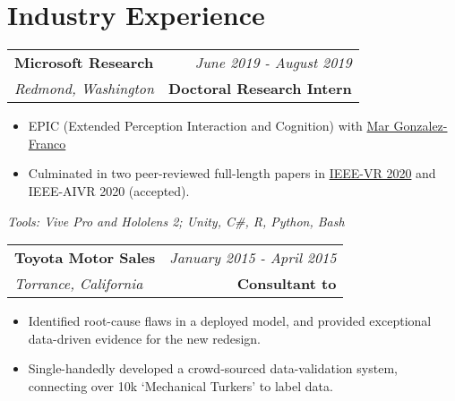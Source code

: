 \documentclass[10pt,a4paper]{article}
\begin{document}
    \vspace*{6mm}\section*{Industry Experience}
  
    \noindent\begin{tabularx}{17cm}{X r}
    \textbf{Microsoft Research} & \textit{June 2019 - August 2019} \\
    \textit{Redmond, Washington} & \textbf{Doctoral Research Intern} \\
  \end{tabularx}

  \vspace*{1mm}\noindent\begin{minipage}{17cm}
    \begin{itemize}[leftmargin=6mm,topsep=0mm,itemsep=-1mm]
      \item EPIC (Extended Perception Interaction and Cognition) with \href{https://www.microsoft.com/en-us/research/people/margon/}{Mar Gonzalez-Franco}
      \item Culminated in two peer-reviewed full-length papers in \href{https://github.com/bc/resume/raw/master/papers/gonzalez-franco_et_al_ieeevr_2020.pdf}{IEEE-VR 2020} and IEEE-AIVR 2020 (accepted).
    \end{itemize}
  \end{minipage}

  \vspace*{2mm}\setlength\parindent{2mm}\begin{minipage}{16.8cm}
    \textit{Tools: Vive Pro and Hololens 2; Unity, C\#, R, Python, Bash}
  \end{minipage}


  \vspace*{3mm}\noindent\begin{tabularx}{17cm}{X r}
    \textbf{Toyota Motor Sales} & \textit{January 2015 - April 2015} \\
    \textit{Torrance, California} & \textbf{Consultant to} \\
  \end{tabularx}

  \vspace*{1mm}\noindent\begin{minipage}{17cm}
    \begin{itemize}[leftmargin=6mm,topsep=0mm,itemsep=-1mm]
      \item Identified root-cause flaws in a deployed model, and provided exceptional data-driven evidence for the new redesign.
      \item Single-handedly developed a crowd-sourced data-validation system, connecting over 10k `Mechanical Turkers' to label data.
    \end{itemize}
  \end{minipage}
\end{document}
